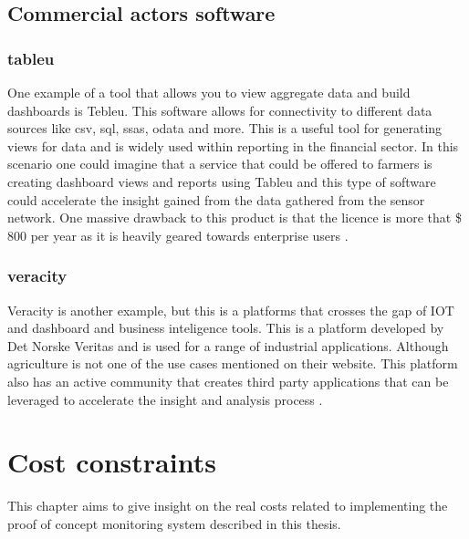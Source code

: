 \documentclass[]{uiophd}
\begin{document}
\section{Commercial actors software}

\subsection{tableu}
One example of a tool that allows you to view aggregate data and build dashboards is Tebleu. This software allows for connectivity to different data sources like csv, sql, ssas, odata and more. This is a useful tool for generating views for data and is widely used within reporting in the financial sector. In this scenario one could imagine that a service that could be offered to farmers is creating dashboard views and reports using Tableu and  this type of software could accelerate the insight gained from the data gathered from the sensor network. One massive drawback to this product is that the licence is more that \$ 800 per year as it is heavily geared towards enterprise users \cite{tableu}.

\subsection{veracity}
Veracity is another example, but this is a platforms that crosses the gap of IOT and dashboard and business inteligence tools. This is a platform developed by Det Norske Veritas and is used for a range of industrial applications. Although agriculture is not one of the use cases mentioned on their website. This platform also has an active community that creates third party applications that can be leveraged to accelerate the insight and analysis process \cite{veracity}.

\chapter{Cost constraints}

This chapter aims to give insight on the real costs related to implementing the proof of concept monitoring system described in this thesis.
\end{document}
